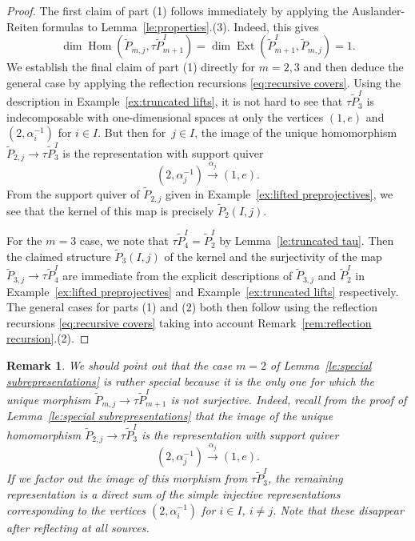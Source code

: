 \documentclass{amsart}
\newtheorem{remark}[theorem]{Remark}
\numberwithin{equation}{section}
\newcommand{\Ext}{\operatorname{Ext}}
\newcommand{\Hom}{\operatorname{Hom}}
\begin{document}
\begin{proof}
  The first claim of part (1) follows immediately by applying the Auslander-Reiten formulas \cite[Theorem IV.2.13]{ass} to Lemma~\ref{le:properties}.(3).
  Indeed, this gives
  \[\dim\Hom(\tilde P_{m,j},\tau\tilde P_{m+1}^I)=\dim\Ext(\tilde P_{m+1}^I,\tilde P_{m,j})=1.\]
  We establish the final claim of part (1) directly for $m=2,3$ and then deduce the general case by applying the reflection recursions \eqref{eq:recursive covers}.
  Using the description in Example~\ref{ex:truncated lifts}, it is not hard to see that $\tau\tilde P_3^I$ is indecomposable with one-dimensional spaces at only the vertices $(1,e)$ and $(2,\alpha_i^{-1})$ for $i\in I$.
  But then for~$j\in I$, the image of the unique homomorphism $\tilde P_{2,j}\to\tau\tilde P_3^I$ is the representation with support quiver
  \[(2,\alpha_j^{-1})\xrightarrow{\alpha_j}(1,e).\]
  From the support quiver of $\tilde P_{2,j}$ given in Example~\ref{ex:lifted preprojectives}, we see that the kernel of this map is precisely $\tilde P_2(I,j)$.

  For the $m=3$ case, we note that $\tau\tilde P_4^I=\tilde P_2^I$ by Lemma~\ref{le:truncated tau}.
  Then the claimed structure $\tilde P_3(I,j)$ of the kernel and the surjectivity of the map $\tilde P_{3,j}\to\tau\tilde P_4^I$ are immediate from the explicit descriptions of $\tilde P_{3,j}$ and $\tilde P_2^I$ in Example~\ref{ex:lifted preprojectives} and Example~\ref{ex:truncated lifts} respectively.
  The general cases for parts (1) and (2) both then follow using the reflection recursions \eqref{eq:recursive covers} taking into account Remark~\ref{rem:reflection recursion}.(2).
\end{proof}

\begin{remark}
  \label{rem:special case}
  We should point out that the case $m=2$ of Lemma~\ref{le:special subrepresentations} is rather special because it is the only one for which the unique morphism $\tilde P_{m,j}\to\tau\tilde P_{m+1}^I$ is not surjective.
  Indeed, recall from the proof of Lemma~\ref{le:special subrepresentations} that the image of the unique homomorphism $\tilde P_{2,j}\to\tau\tilde P_3^I$ is the representation with support quiver
  \begin{equation}
    \label{eq:special case}
    (2,\alpha_j^{-1})\xrightarrow{\alpha_j}(1,e).
  \end{equation}
  If we factor out the image of this morphism from $\tau\tilde P_3^I$, the remaining representation is a direct sum of the simple injective representations corresponding to the vertices $(2,\alpha_i^{-1})$ for $i\in I$, $i\ne j$.
  Note that these disappear after reflecting at all sources.
\end{remark}
\end{document}
